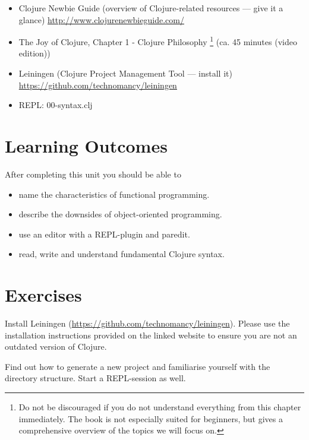 \documentclass[11pt,a4paper]{article}
\begin{document}
	\begin{itemize}
        \item Clojure Newbie Guide (overview of Clojure-related resources --- give it a glance) \url{http://www.clojurenewbieguide.com/}
        \item The Joy of Clojure, Chapter 1 - Clojure Philosophy
		\footnote{Do not be discouraged if you do not understand everything from this chapter immediately. The book is not especially suited for beginners, but gives a comprehensive overview of the topics we will focus on.}
        (ca. 45 minutes (video edition))
        \item Leiningen (Clojure Project Management Tool --- install it) \url{https://github.com/technomancy/leiningen}
        \item REPL: 00-syntax.clj
	\end{itemize}
	
	
	\section{Learning Outcomes}
	
	After completing this unit you should be able to
	
	\begin{itemize}
		\item name the characteristics of functional programming.
		\item describe the downsides of object-oriented programming.
		\item use an editor with a REPL-plugin and paredit.
        \item read, write and understand fundamental Clojure syntax.
	\end{itemize}
	
	\section{Exercises}
	
	
	\begin{exercise}[Leiningen]
		Install Leiningen (\url{https://github.com/technomancy/leiningen}).
		Please use the installation instructions provided on the linked website
		to ensure you are not an outdated version of Clojure.
		
		Find out how to generate a new project
		and familiarise yourself with the directory structure.
		Start a REPL-session as well.
	\end{exercise}
	
\end{document}
